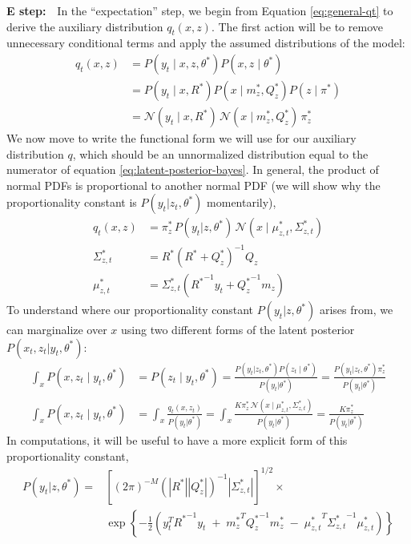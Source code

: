 \documentclass{article}         %
\newcommand{\inv}{^{-1}}
\newcommand{\NN}{\mathcal{N}}
\newcommand{\abs}[1]{\left| #1 \right|}
\newcommand{\cb}[1]{\left\{ #1 \right\}}
\newcommand{\pn}[1]{\left( #1 \right)}
\newcommand{\bc}[1]{\left[ #1 \right]}
\begin{document}
\textbf{E step:}\ \ In the ``expectation'' step, we begin from Equation \ref{eq:general-qt} to derive the auxiliary distribution $q_t(x, z)$. The first action will be to remove unnecessary conditional terms and apply the assumed distributions of the model:
\begin{align}
    \label{eq:latent-posterior-bayes-pared-down}
    q_t(x, z) &= P(y_t \mid x, z, \theta^*)P(x, z \mid \theta^*) \\
    &= P(y_t \mid x, R^*) P(x \mid m^*_{z}, Q^*_{z}) P(z \mid \pi^*) \\
    &= \NN(y_t \mid x, R^*)\, \NN(x \mid m^*_{z}, Q^*_{z})\, \pi_{z}^*
\end{align}
We now move to write the functional form we will use for our auxiliary distribution $q$, which should be an unnormalized distribution equal to the numerator of equation \ref{eq:latent-posterior-bayes}. In general, the product of normal PDFs is proportional to another normal PDF (we will show why the proportionality constant is $P(y_t | z_t, \theta^*)$ momentarily),
\begin{align}
    q_t(x, z) &= \pi_{z}^*\, P(y_t | z, \theta^*)\, \NN(x \mid \mu^*_{z, t}, \Sigma^*_{z, t}) \\
    \Sigma_{z, t}^* &= R^* \pn{R^* + Q^*_{z}}\inv Q_{z} \label{eq:sigma-star} \\
    \mu_{z, t}^* &= \Sigma_{z, t}^* \pn{ {R^*}\inv y_t + {Q^*_z}\inv m_{z} } \label{eq:mu-star}
\end{align}
To understand where our proportionality constant $P(y_t | z, \theta^*)$ arises from, we can marginalize over $x$ using two different forms of the latent posterior $P(x_t, z_t | y_t, \theta^*)$:
\begin{align}
    \int_x P(x, z_t \mid y_t, \theta^*)
    &= P(z_t \mid y_t, \theta^*)
    = \frac{P(y_t | z_t, \theta^*) P(z_t \mid \theta^*)}{P(y_t | \theta^*)}
    =  \frac{P(y_t | z_t, \theta^*) \pi_{z}^*}{P(y_t | \theta^*)}\\
    \int_x P(x, z_t \mid y_t, \theta^*)
    &= \int_x \frac{q_t(x, z_t)}{P(y_t | \theta^*)}
    = \int_x \frac{K \pi_{z}^*\, \NN(x \mid \mu^*_{z, t}, \Sigma^*_{z, t})}{P(y_t | \theta^*)}
    =  \frac{K \pi_{z}^*}{P(y_t | \theta^*)}
\end{align}
In computations, it will be useful to have a more explicit form of this proportionality constant,
\begin{align}
    \label{eq:y-marg-post}
    P(y_t | z, \theta^*) =& \bc{\pn{2\pi}^{-M} \pn{\abs{R^*} \abs{Q_z^*}}\inv \abs{ \Sigma^*_{z, t}}}^{1/2} \times \\
     & \exp\cb{-\frac{1}{2}\pn{y_t^T{R^*}\inv y_t \;+\; {m_z^*}^T{Q_z^*}\inv {m_z^*} \;-\; {\mu_{z, t}^*}^T {\Sigma_{z, t}^*}\inv {\mu_{z, t}^*}}}
\end{align}
\end{document}
